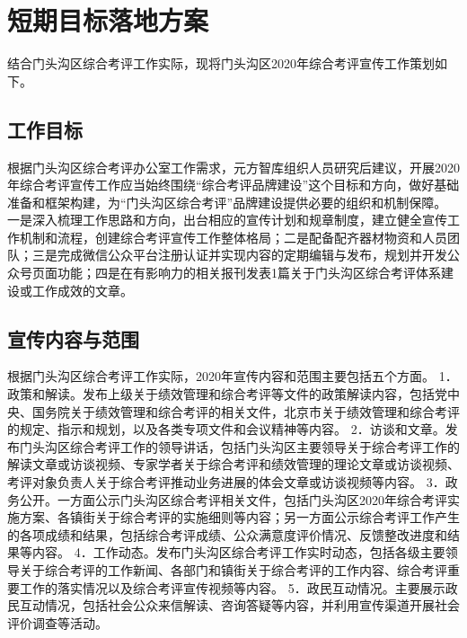 \documentclass[12pt]{article} %
\begin{document}
\section{短期目标落地方案}
结合门头沟区综合考评工作实际，现将门头沟区2020年综合考评宣传工作策划如下。

\subsection{工作目标}
根据门头沟区综合考评办公室工作需求，元方智库组织人员研究后建议，开展2020年综合考评宣传工作应当始终围绕“综合考评品牌建设”这个目标和方向，做好基础准备和框架构建，为“门头沟区综合考评”品牌建设提供必要的组织和机制保障。
一是深入梳理工作思路和方向，出台相应的宣传计划和规章制度，建立健全宣传工作机制和流程，创建综合考评宣传工作整体格局；二是配备配齐器材物资和人员团队；三是完成微信公众平台注册认证并实现内容的定期编辑与发布，规划并开发公众号页面功能；四是在有影响力的相关报刊发表1篇关于门头沟区综合考评体系建设或工作成效的文章。
\subsection{宣传内容与范围}
根据门头沟区综合考评工作实际，2020年宣传内容和范围主要包括五个方面。
1．政策和解读。发布上级关于绩效管理和综合考评等文件的政策解读内容，包括党中央、国务院关于绩效管理和综合考评的相关文件，北京市关于绩效管理和综合考评的规定、指示和规划，以及各类专项文件和会议精神等内容。
2．访谈和文章。发布门头沟区综合考评工作的领导讲话，包括门头沟区主要领导关于综合考评工作的解读文章或访谈视频、专家学者关于综合考评和绩效管理的理论文章或访谈视频、考评对象负责人关于综合考评推动业务进展的体会文章或访谈视频等内容。
3．政务公开。一方面公示门头沟区综合考评相关文件，包括门头沟区2020年综合考评实施方案、各镇街关于综合考评的实施细则等内容；另一方面公示综合考评工作产生的各项成绩和结果，包括综合考评成绩、公众满意度评价情况、反馈整改进度和结果等内容。
4．工作动态。发布门头沟区综合考评工作实时动态，包括各级主要领导关于综合考评的工作新闻、各部门和镇街关于综合考评的工作内容、综合考评重要工作的落实情况以及综合考评宣传视频等内容。
5．政民互动情况。主要展示政民互动情况，包括社会公众来信解读、咨询答疑等内容，并利用宣传渠道开展社会评价调查等活动。
\end{document}
